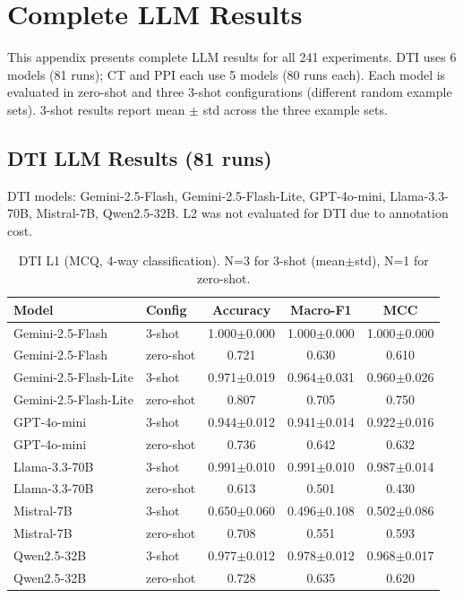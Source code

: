 \section{Complete LLM Results}
\label{app:llm_tables}

This appendix presents complete LLM results for all 241 experiments. DTI uses 6 models (81 runs); CT and PPI each use 5 models (80 runs each). Each model is evaluated in zero-shot and three 3-shot configurations (different random example sets). 3-shot results report mean $\pm$ std across the three example sets.

\subsection{DTI LLM Results (81 runs)}

DTI models: Gemini-2.5-Flash, Gemini-2.5-Flash-Lite, GPT-4o-mini, Llama-3.3-70B, Mistral-7B, Qwen2.5-32B. L2 was not evaluated for DTI due to annotation cost.

\begin{table}[h]
\centering
\caption{DTI L1 (MCQ, 4-way classification). N=3 for 3-shot (mean$\pm$std), N=1 for zero-shot.}
\label{tab:dti_l1_full}
\scriptsize
\begin{tabular}{@{}llccc@{}}
\toprule
\textbf{Model} & \textbf{Config} & \textbf{Accuracy} & \textbf{Macro-F1} & \textbf{MCC} \\
\midrule
Gemini-2.5-Flash & 3-shot & 1.000$\pm$0.000 & 1.000$\pm$0.000 & 1.000$\pm$0.000 \\
Gemini-2.5-Flash & zero-shot & 0.721 & 0.630 & 0.610 \\
Gemini-2.5-Flash-Lite & 3-shot & 0.971$\pm$0.019 & 0.964$\pm$0.031 & 0.960$\pm$0.026 \\
Gemini-2.5-Flash-Lite & zero-shot & 0.807 & 0.705 & 0.750 \\
GPT-4o-mini & 3-shot & 0.944$\pm$0.012 & 0.941$\pm$0.014 & 0.922$\pm$0.016 \\
GPT-4o-mini & zero-shot & 0.736 & 0.642 & 0.632 \\
Llama-3.3-70B & 3-shot & 0.991$\pm$0.010 & 0.991$\pm$0.010 & 0.987$\pm$0.014 \\
Llama-3.3-70B & zero-shot & 0.613 & 0.501 & 0.430 \\
Mistral-7B & 3-shot & 0.650$\pm$0.060 & 0.496$\pm$0.108 & 0.502$\pm$0.086 \\
Mistral-7B & zero-shot & 0.708 & 0.551 & 0.593 \\
Qwen2.5-32B & 3-shot & 0.977$\pm$0.012 & 0.978$\pm$0.012 & 0.968$\pm$0.017 \\
Qwen2.5-32B & zero-shot & 0.728 & 0.635 & 0.620 \\
\bottomrule
\end{tabular}
\end{table}

